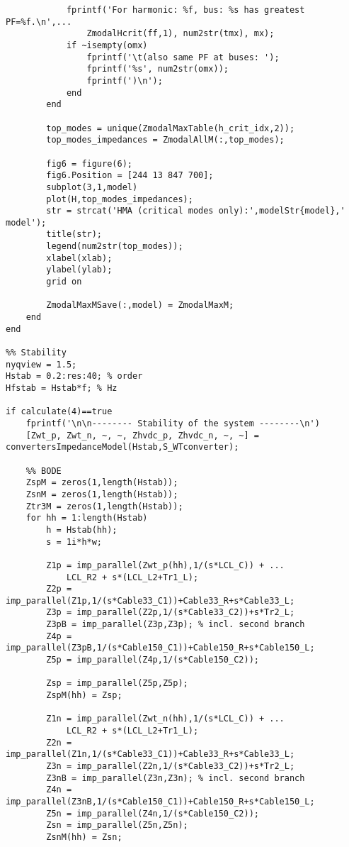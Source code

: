 \begin{appendices}
\begin{lstlisting}
            fprintf('For harmonic: %f, bus: %s has greatest PF=%f.\n',...
                ZmodalHcrit(ff,1), num2str(tmx), mx);
            if ~isempty(omx)
                fprintf('\t(also same PF at buses: ');
                fprintf('%s', num2str(omx));
                fprintf(')\n');
            end
        end

        top_modes = unique(ZmodalMaxTable(h_crit_idx,2));
        top_modes_impedances = ZmodalAllM(:,top_modes);

        fig6 = figure(6);
        fig6.Position = [244 13 847 700];
        subplot(3,1,model)
        plot(H,top_modes_impedances);
        str = strcat('HMA (critical modes only):',modelStr{model},' model');
        title(str);
        legend(num2str(top_modes));
        xlabel(xlab);
        ylabel(ylab);
        grid on
        
        ZmodalMaxMSave(:,model) = ZmodalMaxM;
    end
end

%% Stability
nyqview = 1.5;
Hstab = 0.2:res:40; % order
Hfstab = Hstab*f; % Hz

if calculate(4)==true
    fprintf('\n\n-------- Stability of the system --------\n')
    [Zwt_p, Zwt_n, ~, ~, Zhvdc_p, Zhvdc_n, ~, ~] = convertersImpedanceModel(Hstab,S_WTconverter);
    
    %% BODE
    ZspM = zeros(1,length(Hstab));
    ZsnM = zeros(1,length(Hstab));
    Ztr3M = zeros(1,length(Hstab));
    for hh = 1:length(Hstab)
        h = Hstab(hh);
        s = 1i*h*w;
        
        Z1p = imp_parallel(Zwt_p(hh),1/(s*LCL_C)) + ...
            LCL_R2 + s*(LCL_L2+Tr1_L);
        Z2p = imp_parallel(Z1p,1/(s*Cable33_C1))+Cable33_R+s*Cable33_L;
        Z3p = imp_parallel(Z2p,1/(s*Cable33_C2))+s*Tr2_L;
        Z3pB = imp_parallel(Z3p,Z3p); % incl. second branch
        Z4p = imp_parallel(Z3pB,1/(s*Cable150_C1))+Cable150_R+s*Cable150_L;
        Z5p = imp_parallel(Z4p,1/(s*Cable150_C2));
        
        Zsp = imp_parallel(Z5p,Z5p);
        ZspM(hh) = Zsp;
        
        Z1n = imp_parallel(Zwt_n(hh),1/(s*LCL_C)) + ...
            LCL_R2 + s*(LCL_L2+Tr1_L);
        Z2n = imp_parallel(Z1n,1/(s*Cable33_C1))+Cable33_R+s*Cable33_L;
        Z3n = imp_parallel(Z2n,1/(s*Cable33_C2))+s*Tr2_L;
        Z3nB = imp_parallel(Z3n,Z3n); % incl. second branch
        Z4n = imp_parallel(Z3nB,1/(s*Cable150_C1))+Cable150_R+s*Cable150_L;
        Z5n = imp_parallel(Z4n,1/(s*Cable150_C2));
        Zsn = imp_parallel(Z5n,Z5n);
        ZsnM(hh) = Zsn;
    

\end{lstlisting}
\end{appendices}
